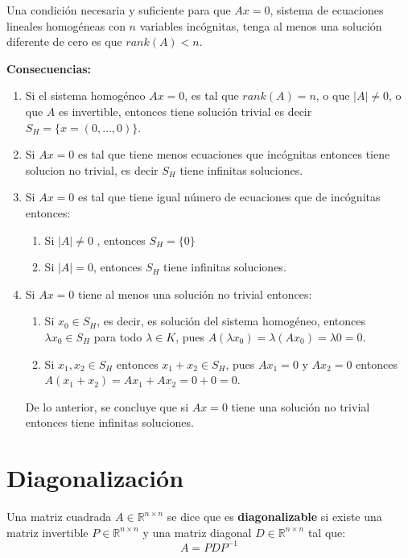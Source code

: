 \begin{thm}
Una condición necesaria y suficiente para que $Ax = 0$, sistema de
ecuaciones lineales homogéneas con $n$ variables incógnitas, tenga al menos
una solución diferente de cero es que $rank(A) < n$.
\end{thm}

\textbf{Consecuencias:}
\begin{enumerate}
    \item Si el sistema homogéneo $Ax = 0$, es tal que $rank (A) = n$, o que $|A| \neq 0$, o que $A$ es
invertible, entonces tiene solución trivial es decir $S_H = \{x=(0, \dots, 0) \}$.
\item Si $Ax = 0$ es tal que tiene menos ecuaciones que incógnitas entonces tiene
solucion no trivial, es decir $S_H$ tiene infinitas soluciones.
\item Si $Ax = 0$ es tal que tiene igual número de ecuaciones que de incógnitas entonces:
\begin{enumerate}
    \item Si $|A| \neq 0$ , entonces $S_H = \{0 \}$
    \item  Si $|A| = 0 $, entonces $S_H$ tiene infinitas soluciones.
\end{enumerate}
\item Si $Ax = 0$ tiene al menos una solución no trivial entonces:
\begin{enumerate}
    \item Si $x_0\in S_H$, es decir, es solución del sistema homogéneo, entonces $\lambda x_0 \in S_H$ para todo $\lambda \in K$, pues $A(\lambda x_0) = \lambda(A x_0) = \lambda 0 = 0$.
    \item  Si $x_1 , x_2 \in S_H$ entonces $x_1 + x_2 \in S_H $, pues $Ax_1 = 0$ y $Ax_2 = 0$ entonces
$A(x_1 + x_2 ) = Ax_1 + Ax_2 = 0 + 0 = 0$.
\end{enumerate}
De lo anterior, se concluye que si $Ax = 0$ tiene una solución no trivial entonces
tiene infinitas soluciones.
\end{enumerate}

\section{Diagonalizaci\'on}
Una matriz cuadrada \( A \in \mathbb{R}^{n \times n} \) se dice que es \textbf{diagonalizable} si existe una matriz invertible \( P \in \mathbb{R}^{n \times n} \) y una matriz diagonal \( D \in \mathbb{R}^{n \times n} \) tal que:
\[
A = P D P^{-1}
\]

